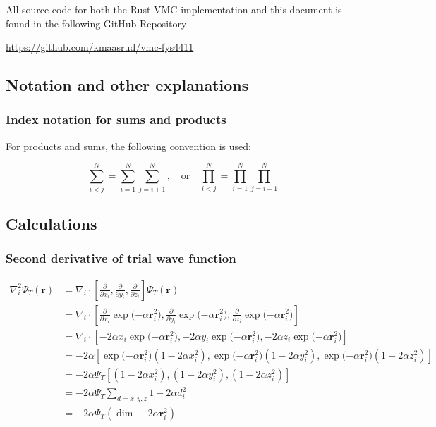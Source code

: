 \documentclass[
]{article}
\begin{document}
All source code for both the Rust VMC implementation and this document
is found in the following GitHub Repository

\url{https://github.com/kmaasrud/vmc-fys4411}

\hypertarget{notation-and-other-explanations}{%
\subsection{Notation and other
explanations}\label{notation-and-other-explanations}}

\hypertarget{index-notation-for-sums-and-products}{%
\subsubsection{Index notation for sums and
products}\label{index-notation-for-sums-and-products}}

For products and sums, the following convention is used:

\[\sum_{i <j}^N = \sum_{i=1}^N \sum_{j=i+1}^N,\quad \text{or}\quad \prod_{i <j}^N = \prod_{i=1}^N \prod_{j=i+1}^N\]

\hypertarget{calculations}{%
\subsection{Calculations}\label{calculations}}

\hypertarget{second-derivative-of-trial-wave-function}{%
\subsubsection{Second derivative of trial wave
function}\label{second-derivative-of-trial-wave-function}}

\[
\begin{aligned}
\nabla_{i}^2 \Psi_{T}(\mathbf{r})
&= \nabla_{i} \cdot\left[\frac{\partial}{\partial x_{i}}, \frac{\partial}{\partial y_{i}},   
   \frac{\partial}{\partial z_{i}}\right] \Psi_{T}(\mathbf{r}) \\
&= \nabla_i \cdot \left[\frac{\partial}{\partial x_i} \exp{(-\alpha
   \mathbf{r}_i^2}),\frac{\partial}{\partial y_i} \exp{(-\alpha \mathbf{r}_i^2}), \frac{\partial}{\partial z_i} \exp{(-\alpha \mathbf{r}_i^2})\right] \\
&= \nabla_{i} \cdot \left[-2 \alpha x_{i} \exp{(-\alpha \mathbf{r}_{i}^{2}}), -2 \alpha
   y_{i}  
   \exp{(-\alpha \mathbf{r}^2_{i}}), -2 \alpha z_{i} \exp{(-\alpha \mathbf{r}_{i}^2})
   \right] \\
&= -2 \alpha \left[  \exp{(-\alpha \mathbf{r}^2_{i}})(1 - 2 \alpha x^2_{i}), \exp{(-\alpha
   \mathbf{r}^2_{i}})(1 - 2 \alpha y^2_{i}), \exp{(-\alpha \mathbf{r}^2_{i}})
   (1 - 2 \alpha z^2_{i}) \right] \\
&= -2\alpha \Psi_{T} \left[(1 - 2 \alpha x^2_{i}), (1 - 2 \alpha y^2_{i}),
   (1 - 2 \alpha  z^2_{i}) \right]\\
&= -2\alpha \Psi_{T}\sum_{d = x,y,z}1 -2\alpha d_{i}^2 \\
&= -2\alpha \Psi_{T}(\dim - 2 \alpha  \mathbf{r}^2_{i})
\end{aligned}
\]
\end{document}
